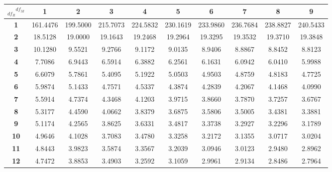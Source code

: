 \begin{center}
\small
\begin{tabular}{c|c|c|c|c|c|c|c|c|c}
\hline
\multicolumn{1}{c}{\textbf{$_{df_R} { }^{df_M}$}}  & \multicolumn{1}{c}{\textbf{1}} & \multicolumn{1}{c}{\textbf{2}} & \multicolumn{1}{c}{\textbf{3}} & \multicolumn{1}{c}{\textbf{4}} & \multicolumn{1}{c}{\textbf{5}} & \multicolumn{1}{c}{\textbf{6}} & \multicolumn{1}{c}{\textbf{7}} & \multicolumn{1}{c}{\textbf{8}} & \multicolumn{1}{c}{\textbf{9}} \tstrut\bstrut\\
\hline
\textbf{1}   & 161.4476   & 199.5000   & 215.7073   & 224.5832   & 230.1619   & 233.9860   & 236.7684   & 238.8827   & 240.5433      \tstrut\\
\textbf{2}   & 18.5128    & 19.0000    & 19.1643    & 19.2468    & 19.2964    & 19.3295    & 19.3532    & 19.3710    & 19.3848       \\
\textbf{3}   & 10.1280    & 9.5521     & 9.2766     & 9.1172     & 9.0135     & 8.9406     & 8.8867     & 8.8452     & 8.8123        \\
\textbf{4}   & 7.7086     & 6.9443     & 6.5914     & 6.3882     & 6.2561     & 6.1631     & 6.0942     & 6.0410     & 5.9988          \\
\textbf{5}   & 6.6079     & 5.7861     & 5.4095     & 5.1922     & 5.0503     & 4.9503     & 4.8759     & 4.8183     & 4.7725          \\
\textbf{6}   & 5.9874     & 5.1433     & 4.7571     & 4.5337     & 4.3874     & 4.2839     & 4.2067     & 4.1468     & 4.0990         \\
\textbf{7}   & 5.5914     & 4.7374     & 4.3468     & 4.1203     & 3.9715     & 3.8660     & 3.7870     & 3.7257     & 3.6767           \\
\textbf{8}   & 5.3177     & 4.4590     & 4.0662     & 3.8379     & 3.6875     & 3.5806     & 3.5005     & 3.4381     & 3.3881         \\
\textbf{9}   & 5.1174     & 4.2565     & 3.8625     & 3.6331     & 3.4817     & 3.3738     & 3.2927     & 3.2296     & 3.1789         \\
\textbf{10}  & 4.9646     & 4.1028     & 3.7083     & 3.4780     & 3.3258     & 3.2172     & 3.1355     & 3.0717     & 3.0204          \\
\textbf{11}  & 4.8443     & 3.9823     & 3.5874     & 3.3567     & 3.2039     & 3.0946     & 3.0123     & 2.9480     & 2.8962        \\
\textbf{12}  & 4.7472     & 3.8853     & 3.4903     & 3.2592     & 3.1059     & 2.9961     & 2.9134     & 2.8486     & 2.7964         \\

\end{tabular}
\end{center}
